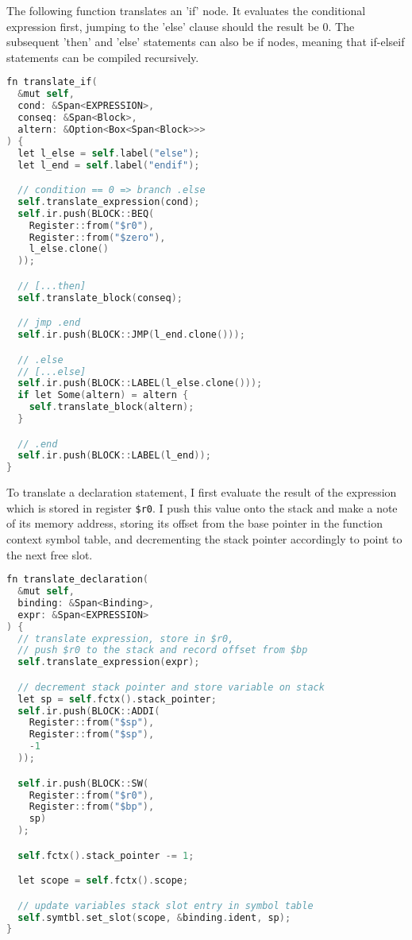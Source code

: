 The following function translates an 'if' node. It evaluates the conditional expression first, jumping to the 'else' clause should the result be 0. The subsequent 'then' and 'else' statements can also be if nodes, meaning that if-elseif statements can be compiled recursively. 

\begin{lstlisting}[language=C]
fn translate_if(
  &mut self, 
  cond: &Span<EXPRESSION>, 
  conseq: &Span<Block>, 
  altern: &Option<Box<Span<Block>>>
) {
  let l_else = self.label("else");
  let l_end = self.label("endif");

  // condition == 0 => branch .else
  self.translate_expression(cond);
  self.ir.push(BLOCK::BEQ(
    Register::from("$r0"), 
    Register::from("$zero"), 
    l_else.clone()
  ));

  // [...then]
  self.translate_block(conseq);

  // jmp .end
  self.ir.push(BLOCK::JMP(l_end.clone()));

  // .else
  // [...else]
  self.ir.push(BLOCK::LABEL(l_else.clone()));
  if let Some(altern) = altern {
    self.translate_block(altern);
  }

  // .end
  self.ir.push(BLOCK::LABEL(l_end));
}
\end{lstlisting}

To translate a declaration statement, I first evaluate the result of the expression which is stored in register \texttt{\$r0}. I push this value onto the stack and make a note of its memory address, storing its offset from the base pointer in the function context symbol table, and decrementing the stack pointer accordingly to point to the next free slot.

\begin{lstlisting}[language=C]
fn translate_declaration(
  &mut self, 
  binding: &Span<Binding>, 
  expr: &Span<EXPRESSION>
) {
  // translate expression, store in $r0, 
  // push $r0 to the stack and record offset from $bp
  self.translate_expression(expr);

  // decrement stack pointer and store variable on stack
  let sp = self.fctx().stack_pointer;
  self.ir.push(BLOCK::ADDI(
    Register::from("$sp"), 
    Register::from("$sp"), 
    -1
  ));

  self.ir.push(BLOCK::SW(
    Register::from("$r0"), 
    Register::from("$bp"), 
    sp)
  );

  self.fctx().stack_pointer -= 1;

  let scope = self.fctx().scope;

  // update variables stack slot entry in symbol table
  self.symtbl.set_slot(scope, &binding.ident, sp);
}
\end{lstlisting}

